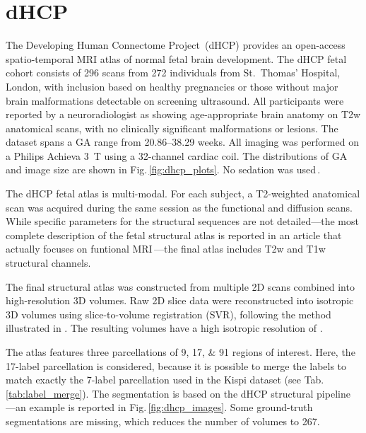 \section{dHCP}
The Developing Human Connectome Project\,\cite{dHCP} (dHCP) provides an open-access spatio-temporal MRI atlas of normal fetal brain development. The dHCP fetal cohort consists of \num{296} scans from \num{272} individuals from St.\ Thomas' Hospital, London, with inclusion based on healthy pregnancies or those without major brain malformations detectable on screening ultrasound. All participants were reported by a neuroradiologist as showing age-appropriate brain anatomy on T2w anatomical scans, with no clinically significant malformations or lesions. The dataset spans a GA range from \numrange{20.86}{38.29} weeks. All imaging was performed on a Philips Achieva \qty{3}{\tesla} using a 32-channel cardiac coil. The distributions of GA and image size are shown in Fig.\,\ref{fig:dhcp_plots}. No sedation was used\,\cite{Karolis2025}.

The dHCP fetal atlas is multi-modal. For each subject, a T2-weighted anatomical scan was acquired during the same session as the functional and diffusion scans. While specific parameters for the structural sequences are not detailed---the most complete description of the fetal structural atlas is reported in an article that actually focuses on funtional MRI\,\cite{Karolis2025}---the final atlas includes T2w and T1w structural channels.

The final structural atlas was constructed from multiple 2D scans combined into high-resolution 3D volumes. Raw 2D slice data were reconstructed into isotropic 3D volumes using slice-to-volume registration (SVR), following the method illustrated in \cite{CorderoGrande2018}. The resulting volumes have a high isotropic resolution of .

The atlas features three parcellations of \numlist{9;17;91} regions of interest. Here, the 17-label parcellation is considered, because it is possible to merge the labels to match exactly the 7-label parcellation used in the Kispi dataset (see Tab.\,\ref{tab:label_merge}). The segmentation is based on the dHCP structural pipeline\,\cite{Makropoulos2018, dHCP_pipeline}---an example is reported in Fig.\,\ref{fig:dhcp_images}. Some ground-truth segmentations are missing, which reduces the number of volumes to \num{267}.


